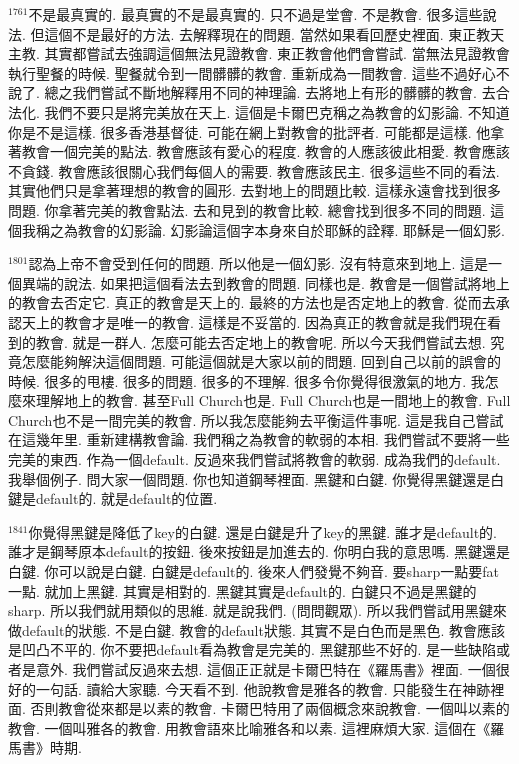 \documentclass{book}
\begin{document}
$^{1761}$不是最真實的.
最真實的不是最真實的.
只不過是堂會.
不是教會.
很多這些說法.
但這個不是最好的方法.
去解釋現在的問題.
當然如果看回歷史裡面.
東正教天主教.
其實都嘗試去強調這個無法見證教會.
東正教會他們會嘗試.
當無法見證教會執行聖餐的時候.
聖餐就令到一間髒髒的教會.
重新成為一間教會.
這些不過好心不說了.
總之我們嘗試不斷地解釋用不同的神理論.
去將地上有形的髒髒的教會.
去合法化.
我們不要只是將完美放在天上.
這個是卡爾巴克稱之為教會的幻影論.
不知道你是不是這樣.
很多香港基督徒.
可能在網上對教會的批評者.
可能都是這樣.
他拿著教會一個完美的點法.
教會應該有愛心的程度.
教會的人應該彼此相愛.
教會應該不貪錢.
教會應該很關心我們每個人的需要.
教會應該民主.
很多這些不同的看法.
其實他們只是拿著理想的教會的圓形.
去對地上的問題比較.
這樣永遠會找到很多問題.
你拿著完美的教會點法.
去和見到的教會比較.
總會找到很多不同的問題.
這個我稱之為教會的幻影論.
幻影論這個字本身來自於耶穌的詮釋.
耶穌是一個幻影.

$^{1801}$認為上帝不會受到任何的問題.
所以他是一個幻影.
沒有特意來到地上.
這是一個異端的說法.
如果把這個看法去到教會的問題.
同樣也是.
教會是一個嘗試將地上的教會去否定它.
真正的教會是天上的.
最終的方法也是否定地上的教會.
從而去承認天上的教會才是唯一的教會.
這樣是不妥當的.
因為真正的教會就是我們現在看到的教會.
就是一群人.
怎麼可能去否定地上的教會呢.
所以今天我們嘗試去想.
究竟怎麼能夠解決這個問題.
可能這個就是大家以前的問題.
回到自己以前的誤會的時候.
很多的甩樓.
很多的問題.
很多的不理解.
很多令你覺得很激氣的地方.
我怎麼來理解地上的教會.
甚至Full Church也是.
Full Church也是一間地上的教會.
Full Church也不是一間完美的教會.
所以我怎麼能夠去平衡這件事呢.
這是我自己嘗試在這幾年里.
重新建構教會論.
我們稱之為教會的軟弱的本相.
我們嘗試不要將一些完美的東西.
作為一個default.
反過來我們嘗試將教會的軟弱.
成為我們的default.
我舉個例子.
問大家一個問題.
你也知道鋼琴裡面.
黑鍵和白鍵.
你覺得黑鍵還是白鍵是default的.
就是default的位置.

$^{1841}$你覺得黑鍵是降低了key的白鍵.
還是白鍵是升了key的黑鍵.
誰才是default的.
誰才是鋼琴原本default的按鈕.
後來按鈕是加進去的.
你明白我的意思嗎.
黑鍵還是白鍵.
你可以說是白鍵.
白鍵是default的.
後來人們發覺不夠音.
要sharp一點要fat一點.
就加上黑鍵.
其實是相對的.
黑鍵其實是default的.
白鍵只不過是黑鍵的sharp.
所以我們就用類似的思維.
就是說我們.
(問問觀眾).
所以我們嘗試用黑鍵來做default的狀態.
不是白鍵.
教會的default狀態.
其實不是白色而是黑色.
教會應該是凹凸不平的.
你不要把default看為教會是完美的.
黑鍵那些不好的.
是一些缺陷或者是意外.
我們嘗試反過來去想.
這個正正就是卡爾巴特在《羅馬書》裡面.
一個很好的一句話.
讀給大家聽.
今天看不到.
他說教會是雅各的教會.
只能發生在神跡裡面.
否則教會從來都是以素的教會.
卡爾巴特用了兩個概念來說教會.
一個叫以素的教會.
一個叫雅各的教會.
用教會語來比喻雅各和以素.
這裡麻煩大家.
這個在《羅馬書》時期.
\end{document}

